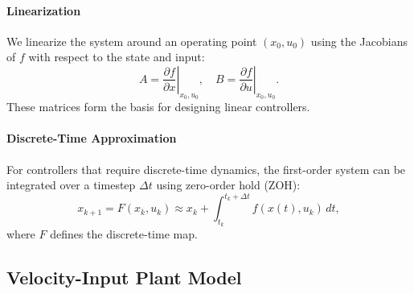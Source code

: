 \paragraph{Linearization}  
We linearize the system around an operating point $(x_0,u_0)$ using the Jacobians of $f$ with respect to the state and input:
\begin{equation}
\label{eq:jacobians}
A = \left. \frac{\partial f}{\partial x} \right|_{x_0, u_0}, \quad
B = \left. \frac{\partial f}{\partial u} \right|_{x_0, u_0}.
\end{equation}
These matrices form the basis for designing linear controllers.

\paragraph{Discrete-Time Approximation}  
For controllers that require discrete-time dynamics, the first-order system can be integrated over a timestep $\Delta t$ using zero-order hold (ZOH):
\begin{equation}
\label{eq:discrete_map}
x_{k+1} = F(x_k, u_k) \approx x_k + \int_{t_k}^{t_k + \Delta t} f(x(t), u_k) \, dt,
\end{equation}
where $F$ defines the discrete-time map. 

\subsection{Velocity-Input Plant Model}
\label{sec:velocity_input}

